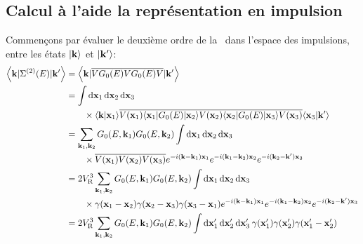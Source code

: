 \subsection{Calcul à l'aide la représentation en impulsion}
Commençons par évaluer le deuxième ordre de la \selfenergy\ dans l'espace des impulsions, entre les états $\left| \mathbf{k} \right\rangle$ et $\left| \mathbf{k}' \right\rangle$:
\begin{align}
\left\langle \mathbf{k} | \Sigma^{(2)}(E) | \mathbf{k}' \right\rangle &= \left\langle \mathbf{k} | \overline{V G_0(E) V G_0(E) V} | \mathbf{k}' \right\rangle \\
&=\int{\diff\mathbf{x}_{\mathrm{1}}\diff\mathbf{x}_{\mathrm{2}}\diff\mathbf{x}_{\mathrm{3}}\:}  \\
&\nonumber\qquad\times \langle\mathbf{k}|\mathbf{x}_{\mathrm{1}}\rangle \overline{V(\mathbf{x}_{\mathrm{1}}) \langle\mathbf{x}_{\mathrm{1}}|G_0(E)|\mathbf{x}_{\mathrm{2}}\rangle V(\mathbf{x}_{\mathrm{2}}) \langle\mathbf{x}_{\mathrm{2}}|G_0(E)|\mathbf{x}_{\mathrm{3}}\rangle V(\mathbf{x}_{\mathrm{3}})} \langle\mathbf{x}_{\mathrm{3}}|\mathbf{k}'\rangle \\
&= \sum_{\mathbf{k}_{\mathrm{1}},\mathbf{k}_{\mathrm{2}}}{ G_0(E,\mathbf{k}_{\mathrm{1}}) G_0(E,\mathbf{k}_{\mathrm{2}})} \int{\diff\mathbf{x}_{\mathrm{1}} \diff\mathbf{x}_{\mathrm{2}} \diff\mathbf{x}_{\mathrm{3}}} \\
&\nonumber\qquad\times \overline{V(\mathbf{x}_{\mathrm{1}})V(\mathbf{x}_{\mathrm{2}})V(\mathbf{x}_{\mathrm{3}})} e^{-i(\mathbf{k}-\mathbf{k}_{\mathrm{1}})\mathbf{x}_{\mathrm{1}}} e^{-i(\mathbf{k}_{\mathrm{1}}-\mathbf{k}_{\mathrm{2}})\mathbf{x}_{\mathrm{2}}} e^{-i(\mathbf{k}_{\mathrm{2}}-\mathbf{k}')\mathbf{x}_{\mathrm{3}}} \\
&=2 \VR^3 \sum_{\mathbf{k}_{\mathrm{1}},\mathbf{k}_{\mathrm{2}}}{ G_0(E,\mathbf{k}_{\mathrm{1}}) G_0(E,\mathbf{k}_{\mathrm{2}})} \int{\diff\mathbf{x}_{\mathrm{1}} \diff\mathbf{x}_{\mathrm{2}} \diff\mathbf{x}_{\mathrm{3}}} \\
&\nonumber\qquad\times \gamma(\mathbf{x}_{\mathrm{1}}-\mathbf{x}_{\mathrm{2}})\gamma(\mathbf{x}_{\mathrm{2}}-\mathbf{x}_{\mathrm{3}})\gamma(\mathbf{x}_{\mathrm{3}}-\mathbf{x}_{\mathrm{1}}) e^{-i(\mathbf{k}-\mathbf{k}_{\mathrm{1}})\mathbf{x}_{\mathrm{1}}} e^{-i(\mathbf{k}_{\mathrm{1}}-\mathbf{k}_{\mathrm{2}})\mathbf{x}_{\mathrm{2}}} e^{-i(\mathbf{k}_{\mathrm{2}}-\mathbf{k}')\mathbf{x}_{\mathrm{3}}} \\
&= 2 \VR^3 \sum_{\mathbf{k}_{\mathrm{1}},\mathbf{k}_{\mathrm{2}}}{G_0(E,\mathbf{k}_{\mathrm{1}}) G_0(E,\mathbf{k}_{\mathrm{2}})} \int{\diff\mathbf{x}_{\mathrm{1}}'\diff\mathbf{x}_{\mathrm{2}}'\diff\mathbf{x}_{\mathrm{3}}' \: \gamma(\mathbf{x}_{\mathrm{1}}')\gamma(\mathbf{x}_{\mathrm{2}}')\gamma(\mathbf{x}_{\mathrm{1}}'-\mathbf{x}_{\mathrm{2}}')}\\

\end{align}
